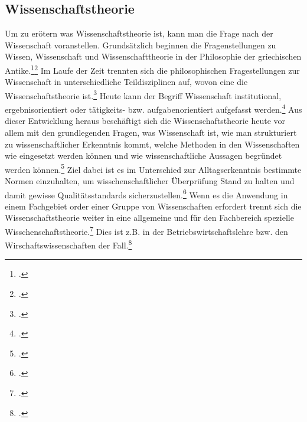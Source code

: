 \documentclass[a4paper,12pt]{article}
\begin{document}
\subsection{Wissenschaftstheorie}
Um zu erötern was Wissenschaftstheorie ist, kann man die Frage nach der Wissenschaft voranstellen. Grundsätzlich beginnen die Fragenstellungen zu Wissen, Wissenschaft und Wissenschafttheorie in der Philosophie der griechischen Antike.\footcite[S. 3]{Kornmesser2020}\footcite[S. 686]{Reicher2023} Im Laufe der Zeit trennten sich die philosophischen Fragestellungen zur Wissenschaft in unterschiedliche Teildisziplinen auf, wovon eine die Wissenschaftstheorie ist.\footcite[S. 4]{Kornmesser2020} Heute kann der Begriff Wissenschaft institutional, ergebnisorientiert oder tätigkeits- bzw. aufgabenorientiert aufgefasst werden.\footcite[S. 4]{Kornmeier2007} Aus dieser Entwicklung heraus beschäftigt sich die Wissenschaftstheorie heute vor allem mit den grundlegenden Fragen, was Wissenschaft ist, wie man strukturiert zu wissenschaftlicher Erkenntnis kommt, welche Methoden in den Wissenschaften wie eingesetzt werden können und wie wissenschaftliche Aussagen begründet werden können.\footcite[S. 5]{Kornmesser2020} Ziel dabei ist es im Unterschied zur Alltagserkenntnis bestimmte Normen einzuhalten, um wisschenschaftlicher Überprüfung Stand zu halten und damit gewisse Qualitätsstandards sicherzustellen.\footcite[S. 9]{Helfrich2024} Wenn es die Anwendung in einem Fachgebiet order einer Gruppe von Wissenschaften erfordert trennt sich die Wissenschaftstheorie weiter in eine allgemeine und für den Fachbereich spezielle Wisschenschaftstheorie.\footcite[S. 5]{Kornmesser2020} Dies ist z.B. in der Betriebswirtschaftslehre bzw. den Wirschaftswissenschaften der Fall.\footcite[S. 25]{Helfrich2024}
\end{document}
